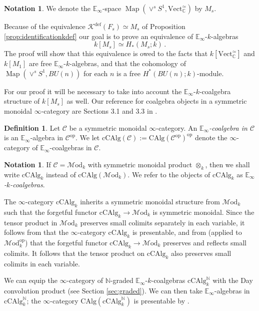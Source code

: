 \documentclass[oneside, a4paper, 12pt]{article}
\numberwithin{equation}{section}
\newcommand{\Kdef}{\mathcal{K}^{\mathrm{def}}}
\newcommand{\Mod}{\mathcal{M}\mathrm{od}}
\newcommand{\CAlg}{\mathrm{CAlg}}
\newcommand{\cCAlg}{\mathrm{cCAlg}}
\newcommand{\C}{\mathbb{C}}
\newcommand{\N}{\mathbb{N}}
\newcommand{\Vect}{\mathrm{Vect}}
\newcommand{\Map}{\operatorname{Map}}
\newcommand{\op}{\mathrm{op}}
\theoremstyle{plain}
\theoremstyle{definition}
\newtheorem{definition}[theorem]{Definition}
\newtheorem{notation}[theorem]{Notation}
\theoremstyle{remark}
\begin{document}
\begin{notation}
We denote the $\mathbb{E}_\infty$-space $\Map(\vee^s S^1,\Vect_{\C}^{\simeq})$ by $M_s$.
\end{notation}

Because of the equivalence $\Kdef(F_s)\simeq M_s$ of Proposition \ref{prop:identificationkdef} our goal is to prove an equivalence of $\mathbb{E}_\infty$-$k$-algebras
\[
k[M_s] \simeq H_\ast(M_s;k)\, .
\]
The proof will show that this equivalence is owed to the facts that $k[\Vect_{\C}^\simeq]$ and $k[M_1]$ are free $\mathbb{E}_\infty$-$k$-algebras, and that the cohomology of $\Map(\vee^s S^1,BU(n))$ for each $n$ is a free $H^\ast(BU(n);k)$-module.


For our proof it will be necessary to take into account the $\mathbb{E}_\infty$-$k$-coalgebra structure of $k[M_s]$ as well. Our reference for coalgebra objects in a symmetric monoidal $\infty$-category are Sections 3.1 and 3.3 in \cite{Elliptic}. 



\begin{definition} Let $\mathcal{C}$ be a symmetric monoidal $\infty$-category.  An \emph{$\mathbb{E}_\infty$-coalgebra in $\mathcal{C}$} is an $\mathbb{E}_\infty$-algebra in $\mathcal{C}^{\op}$. We let $\cCAlg(\mathcal{C}):=\CAlg(\mathcal{C}^\op)^\op$ denote the $\infty$-category of $\mathbb{E}_\infty$-coalgebras in $\mathcal{C}$.
\end{definition}

\begin{notation}
If $\mathcal{C}=\Mod_k$ with symmetric monoidal product $\otimes_k$, then we shall write $\cCAlg_k$ instead of $\cCAlg(\Mod_k)$. We refer to the objects of $\cCAlg_k$ as \emph{$\mathbb{E}_\infty$-$k$-coalgebras}.
\end{notation}


The $\infty$-category $\cCAlg_k$ inherits a symmetric monoidal structure from $\Mod_k$ such that the forgetful functor $\cCAlg_k \to \Mod_k$ is symmetric monoidal. Since the tensor product in $\Mod_k$ preserves small colimits separately in each variable, it follows from \cite[Corollary 3.1.4]{Elliptic} that the $\infty$-category $\cCAlg_k$ is presentable, and from \cite[3.2.2.5]{HA} (applied to $\Mod_k^\op$) that the forgetful functor $\cCAlg_k \to \Mod_k$ preserves and reflects small colimits. It follows that the tensor product on $\cCAlg_k$ also preserves small colimits in each variable.

We can equip the $\infty$-category of $\N$-graded $\mathbb{E}_\infty$-$k$-coalgebras $\cCAlg_k^\N$ with the Day convolution product (see Section \ref{sec:graded}). We can then take $\mathbb{E}_\infty$-algebras in $\cCAlg_k^\N$; the $\infty$-category $\CAlg(\cCAlg_k^\N)$ is presentable by \cite[3.2.3.5]{HA}.
\end{document}
